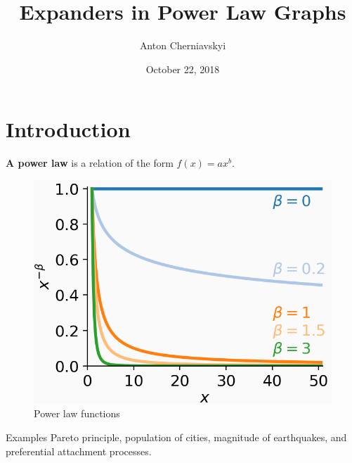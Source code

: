 \documentclass{beamer}
\title{Expanders in Power Law Graphs}
\author{Anton Cherniavskyi}
\date{October 22, 2018}
\institute{Simon Fraser University}
\newcommand{\autotitle}{\secname\ifdefempty{\subsecname}{}{~--- \subsecname}}
\newcommand{\clearsubsecname}{\long\def\subsecname{}}
\begin{document}
\maketitle

\section{Introduction}
\clearsubsecname

\begin{frame}{\autotitle}
    \textbf{A power law} is a relation of the form $f(x)=ax^b$.
    \begin{figure}
        \centering
        \includegraphics[scale=0.5]{images/generated_presentation/power-law}
        \caption{Power law functions}
    \end{figure}
    \begin{exampleblock}{Examples}
        Pareto principle, population of cities,
        magnitude of earthquakes, and preferential attachment processes.
    \end{exampleblock}
\end{frame}
\end{document}
